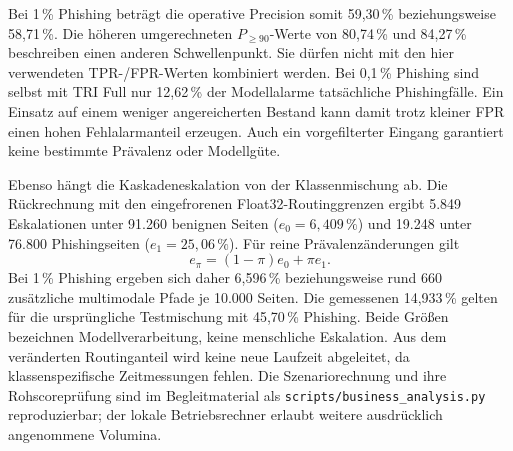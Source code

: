 Bei 1\,\% Phishing beträgt die operative Precision somit 59,30\,\% beziehungsweise
58,71\,\%. Die höheren umgerechneten $P_{\geq 90}$-Werte von 80,74\,\% und 84,27\,\%
beschreiben einen anderen Schwellenpunkt. Sie dürfen nicht mit den hier verwendeten
TPR-/FPR-Werten kombiniert werden. Bei 0,1\,\% Phishing sind selbst mit TRI Full nur
12,62\,\% der Modellalarme tatsächliche Phishingfälle. Ein Einsatz auf einem weniger
angereicherten Bestand kann damit trotz kleiner FPR einen hohen Fehlalarmanteil erzeugen.
Auch ein vorgefilterter Eingang garantiert keine bestimmte Prävalenz oder Modellgüte.

Ebenso hängt die Kaskadeneskalation von der Klassenmischung ab. Die Rückrechnung mit den
eingefrorenen Float32-Routinggrenzen ergibt 5.849 Eskalationen unter 91.260 benignen
Seiten ($e_0=6{,}409\,\%$) und 19.248 unter 76.800 Phishingseiten
($e_1=25{,}06\,\%$). Für reine Prävalenzänderungen gilt
\[
e_{\pi}=(1-\pi)e_0+\pi e_1.
\]
Bei 1\,\% Phishing ergeben sich daher 6,596\,\% beziehungsweise rund 660 zusätzliche
multimodale Pfade je 10.000 Seiten. Die gemessenen 14,933\,\% gelten für die ursprüngliche
Testmischung mit 45,70\,\% Phishing. Beide Größen bezeichnen Modellverarbeitung,
keine menschliche Eskalation. Aus dem veränderten Routinganteil wird keine neue Laufzeit
abgeleitet, da klassenspezifische Zeitmessungen fehlen. Die Szenariorechnung und ihre
Rohscoreprüfung sind im Begleitmaterial als \nolinkurl{scripts/business_analysis.py}
reproduzierbar; der lokale Betriebsrechner erlaubt weitere ausdrücklich angenommene Volumina.
